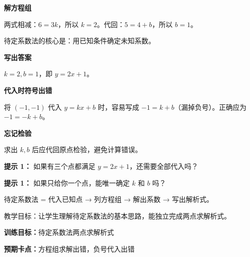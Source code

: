 \documentclass{exam-zh}
\newcommand{\eduSubTitle}[1]{%
  \vspace{1mm}
  {\color{edu-blue}\bfseries #1}\par
  \vspace{1mm}
}
\begin{document}
\begin{eduSoftBox}
\eduSubTitle{解方程组}两式相减：$6 = 3k$，所以 $k = 2$。代回：$5 = 4 + b$，所以 $b = 1$。\par{\small\color{edu-muted}待定系数法的核心是：用已知条件确定未知系数。}\end{eduSoftBox}




\begin{eduSoftBox}
\eduSubTitle{写出答案}$k = 2, b = 1$，即 $y = 2x + 1$。    \par\hspace{5mm}{\small — 检验：$(2, 2\times2+1) = (2,5)$ ✓}
    \par\hspace{5mm}{\small — 检验：$(-1, 2\times(-1)+1) = (-1,-1)$ ✓}
\end{eduSoftBox}





\begin{eduMistakeBox}
\eduSubTitle{代入时符号出错}将 $(-1,-1)$ 代入 $y=kx+b$ 时，容易写成 $-1 = k + b$（漏掉负号）。正确应为 $-1 = -k + b$。\end{eduMistakeBox}




\begin{eduMistakeBox}
\eduSubTitle{忘记检验}求出 $k, b$ 后应代回原点检验，避免计算错误。\end{eduMistakeBox}





\begin{eduReadTipBox}
  \textbf{提示 1：}
如果有三个点都满足 $y=2x+1$，还需要全部代入吗？\end{eduReadTipBox}




\begin{eduReadTipBox}
  \textbf{提示 1：}
如果只给你一个点，能唯一确定 $k$ 和 $b$ 吗？\end{eduReadTipBox}





\begin{eduReadTipBox}
待定系数法 = 代入已知点 → 列方程组 → 解出系数 → 写出解析式。\end{eduReadTipBox}



\clearpage


\begin{eduReadTipBox}
教学目标：让学生理解待定系数法的基本思路，能独立完成两点求解析式。\end{eduReadTipBox}


\begin{eduTeacherNote}
  \textbf{训练目标：}待定系数法两点求解析式\par
  \textbf{预期卡点：}方程组求解出错，负号代入出错
\end{eduTeacherNote}
\end{document}
